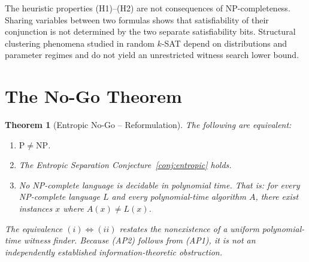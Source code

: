 \documentclass[aps,prd,twocolumn,superscriptaddress,nofootinbib]{revtex4-2}
\newtheorem{theorem}{Theorem}[section]
\theoremstyle{definition}
\theoremstyle{remark}
\newcommand{\NP}{\mathrm{NP}}
\newcommand{\PP}{\mathrm{P}}
\begin{document}
The heuristic properties (H1)--(H2) are not consequences of
NP-completeness. Sharing variables between two formulas shows
that satisfiability of their conjunction is not determined by
the two separate satisfiability bits. Structural clustering
phenomena studied in random $k$-SAT depend on distributions and
parameter regimes and do not yield an unrestricted witness
search lower bound.

\section{The No-Go Theorem}
\label{sec:nogo}

\begin{theorem}[Entropic No-Go -- Reformulation]
\label{thm:nogo}
The following are equivalent:
\begin{enumerate}
\item[(i)] $\PP \neq \NP$.
\item[(ii)] The Entropic Separation Conjecture~\ref{conj:entropic} holds.
\item[(iii)] No NP-complete language is decidable in polynomial time. That is: for every NP-complete language $L$ and every polynomial-time algorithm $A$, there exist instances $x$ where $A(x) \neq L(x)$.
\end{enumerate}
The equivalence $(i) \Leftrightarrow (ii)$ restates the nonexistence of a uniform polynomial-time witness finder. Because (AP2) follows from (AP1), it is not an independently established information-theoretic obstruction.
\end{theorem}
\end{document}
